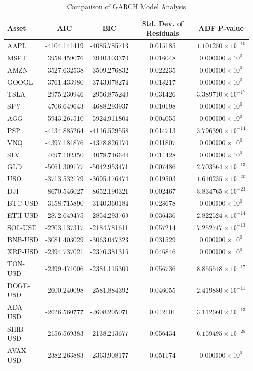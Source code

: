 \begin{table}[h]
\centering
\begin{tabular}{|l|c|c|c|c|}
\hline
\textbf{Asset} & \textbf{AIC} & \textbf{BIC} & \textbf{Std. Dev. of Residuals} & \textbf{ADF P-value} \\
\hline
AAPL & -4104.141419 & -4085.785713 & 0.015185 & $1.101250 \times 10^{-10}$ \\
MSFT & -3958.459076 & -3940.103370 & 0.016048 & $0.000000 \times 10^{0}$ \\
AMZN & -3527.632538 & -3509.276832 & 0.022235 & $0.000000 \times 10^{0}$ \\
GOOGL & -3761.433980 & -3743.078274 & 0.018217 & $0.000000 \times 10^{0}$ \\
TSLA & -2975.230946 & -2956.875240 & 0.031426 & $3.389710 \times 10^{-17}$ \\
SPY & -4706.649643 & -4688.293937 & 0.010198 & $0.000000 \times 10^{0}$ \\
AGG & -5943.267510 & -5924.911804 & 0.004055 & $0.000000 \times 10^{0}$ \\
PSP & -4134.885264 & -4116.529558 & 0.014713 & $3.796390 \times 10^{-14}$ \\
VNQ & -4397.181876 & -4378.826170 & 0.011807 & $0.000000 \times 10^{0}$ \\
SLV & -4097.102350 & -4078.746644 & 0.014428 & $0.000000 \times 10^{0}$ \\
GLD & -5061.309177 & -5042.953471 & 0.007486 & $2.703564 \times 10^{-13}$ \\
USO & -3713.532179 & -3695.176474 & 0.019503 & $1.610235 \times 10^{-20}$ \\
DJI & -8670.546027 & -8652.190321 & 0.002467 & $8.834765 \times 10^{-23}$ \\
BTC-USD & -3158.715890 & -3140.360184 & 0.028678 & $0.000000 \times 10^{0}$ \\
ETH-USD & -2872.649475 & -2854.293769 & 0.036436 & $2.822524 \times 10^{-14}$ \\
SOL-USD & -2203.137317 & -2184.781611 & 0.057214 & $7.252747 \times 10^{-13}$ \\
BNB-USD & -3081.403029 & -3063.047323 & 0.031529 & $0.000000 \times 10^{0}$ \\
XRP-USD & -2394.737021 & -2376.381316 & 0.046846 & $0.000000 \times 10^{0}$ \\
TON-USD & -2399.471006 & -2381.115300 & 0.056736 & $8.855518 \times 10^{-17}$ \\
DOGE-USD & -2600.240098 & -2581.884392 & 0.046055 & $2.419880 \times 10^{-11}$ \\
ADA-USD & -2626.560777 & -2608.205071 & 0.042101 & $3.112660 \times 10^{-13}$ \\
SHIB-USD & -2156.569383 & -2138.213677 & 0.056434 & $6.159495 \times 10^{-25}$ \\
AVAX-USD & -2382.263883 & -2363.908177 & 0.051174 & $0.000000 \times 10^{0}$ \\
\hline
\end{tabular}
\caption{Comparison of GARCH Model Analysis}
\label{tab:garch_comparison}
\end{table}